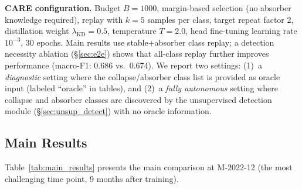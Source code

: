 \documentclass[journal]{IEEEtran}
\newcommand{\ours}{CARE}  %
\begin{document}
\textbf{\ours{} configuration.}
Budget $B=1000$, margin-based selection (no absorber knowledge required), replay with $k=5$ samples per class, target repeat factor 2, distillation weight $\lambda_{\text{KD}}=0.5$, temperature $T=2.0$, head fine-tuning learning rate $10^{-3}$, 30 epochs.
Main results use stable+absorber class replay; a detection necessity ablation (\S\ref{sec:e2e}) shows that all-class replay further improves performance (macro-F1: 0.686 vs.\ 0.674).
We report two settings: (1)~a \textit{diagnostic} setting where the collapse/absorber class list is provided as oracle input (labeled ``oracle'' in tables), and (2)~a \textit{fully autonomous} setting where collapse and absorber classes are discovered by the unsupervised detection module (\S\ref{sec:unsup_detect}) with no oracle information.

\subsection{Main Results}

Table~\ref{tab:main_results} presents the main comparison at M-2022-12 (the most challenging time point, 9 months after training).
\end{document}
